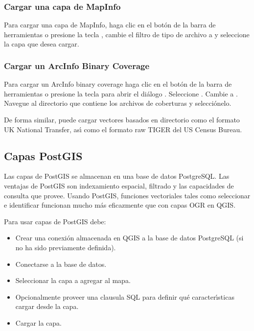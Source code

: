 \subsubsection{Cargar una capa de MapInfo}

Para cargar una capa de MapInfo, haga clic en el bot\'on  
de la barra de herramientas o presione la tecla , cambie el filtro de tipo de archivo a
 y seleccione la capa que desea cargar.

\subsubsection{Cargar un ArcInfo Binary Coverage}

Para cargar un ArcInfo binary coverage haga clic en el bot\'on  
 de la barra de herramientas
o presione la tecla  para abrir el di\'alogo 
.  Seleccione . Cambie a . 
Navegue al directorio que contiene los archivos de coberturas y selecci\'onelo.

De forma similar, puede cargar vectores basados en directorio como el formato UK National Transfer, as\'{\i} como el 
formato raw TIGER del US Census Bureau.

\subsection{Capas PostGIS}
\label{label_postgis} 

Las capas de PostGIS se almacenan en una base de datos PostgreSQL. Las ventajas de PostGIS
son indexamiento espacial, filtrado y las capacidades de consulta que provee. Usando PostGIS, funciones
vectoriales tales como seleccionar e identificar funcionan mucho más eficazmente que con
capas OGR en QGIS.

Para usar capas de PostGIS debe:
\begin{itemize}
\item Crear una conexi\'on almacenada en QGIS a la base de datos PostgreSQL (si no ha sido
previamente definida).
\item Conectarse a la base de datos.
\item Seleccionar la capa a agregar al mapa.
\item Opcionalmente proveer una clausula SQL 
para definir qué caracter\'{\i}sticas cargar desde la capa.
\item Cargar la capa.
\end{itemize}

